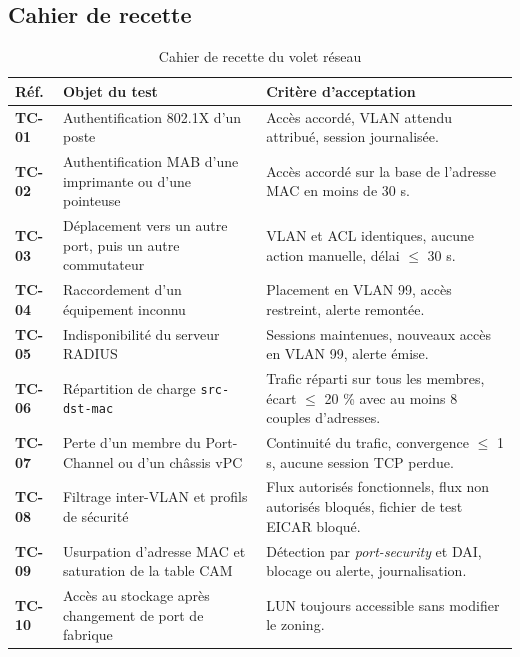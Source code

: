 \documentclass[11pt,a4paper]{article}
\newcommand{\ttb}[1]{\texttt{\small #1}}
\newcommand{\rid}[1]{\textcolor{primary}{\textbf{\small #1}}}
\begin{document}
\subsection{Cahier de recette}
\begin{table}[H]
\centering
\caption{Cahier de recette du volet réseau}
\begin{tabularx}{\textwidth}{L{1.3cm} L{4.6cm} Y}
\toprule
{}\textbf{Réf.} & \textbf{Objet du test} & \textbf{Critère d'acceptation} \\
\midrule
\rid{TC-01} & Authentification 802.1X d'un poste & Accès accordé, VLAN attendu attribué, session journalisée. \\
\rid{TC-02} & Authentification MAB d'une imprimante ou d'une pointeuse & Accès accordé sur la base de l'adresse MAC en moins de 30 s. \\
\rid{TC-03} & Déplacement vers un autre port, puis un autre commutateur & VLAN et ACL identiques, aucune action manuelle, délai $\leq$ 30 s. \\
\rid{TC-04} & Raccordement d'un équipement inconnu & Placement en VLAN 99, accès restreint, alerte remontée. \\
\rid{TC-05} & Indisponibilité du serveur RADIUS & Sessions maintenues, nouveaux accès en VLAN 99, alerte émise. \\
\rid{TC-06} & Répartition de charge \ttb{src-dst-mac} & Trafic réparti sur tous les membres, écart $\leq$ 20 \% avec au moins 8 couples d'adresses. \\
\rid{TC-07} & Perte d'un membre du Port-Channel ou d'un châssis vPC & Continuité du trafic, convergence $\leq$ 1 s, aucune session TCP perdue. \\
\rid{TC-08} & Filtrage inter-VLAN et profils de sécurité & Flux autorisés fonctionnels, flux non autorisés bloqués, fichier de test EICAR bloqué. \\
\rid{TC-09} & Usurpation d'adresse MAC et saturation de la table CAM & Détection par \textit{port-security} et DAI, blocage ou alerte, journalisation. \\
\rid{TC-10} & Accès au stockage après changement de port de fabrique & LUN toujours accessible sans modifier le zoning. \\
\bottomrule
\end{tabularx}
\end{table}
\end{document}

